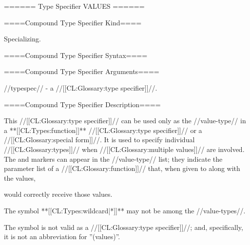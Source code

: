 ====== Type Specifier VALUES ======

====Compound Type Specifier Kind====

Specializing.

====Compound Type Specifier Syntax====




====Compound Type Specifier Arguments====

//typespec// - a //[[CL:Glossary:type specifier]]//.

====Compound Type Specifier Description====

This //[[CL:Glossary:type specifier]]// can be used only as the //value-type// in a **[[CL:Types:function]]** //[[CL:Glossary:type specifier]]// or a  //[[CL:Glossary:special form]]//. It is used to specify individual //[[CL:Glossary:types]]// when //[[CL:Glossary:multiple values]]// are involved. The  and  markers can appear in the //value-type// list; they indicate the parameter list of a //[[CL:Glossary:function]]// that, when given to  along with the values,

would correctly receive those values.

The symbol **[[CL:Types:wildcard|*]]** may not be among the //value-types//.

The symbol  is not valid as a //[[CL:Glossary:type specifier]]//; and, specifically, it is not an abbreviation for ''(values)''.

